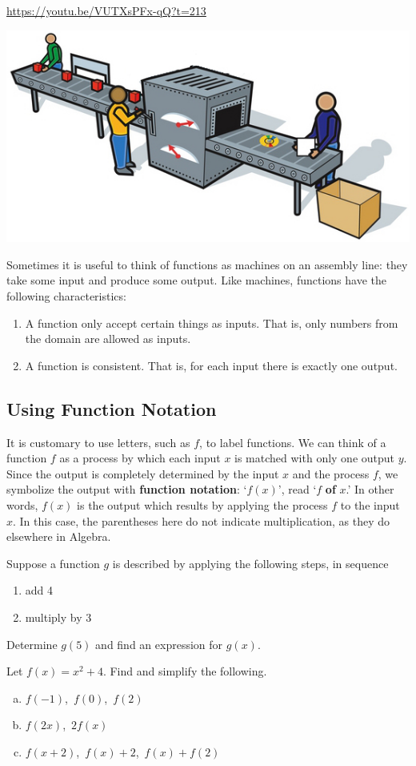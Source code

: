 \documentclass[oneside,10pt]{book}
\begin{document}
\url{https://youtu.be/VUTXsPFx-qQ?t=213}

\includegraphics[width=0.5\linewidth]{3-1-lecture/001Production_Line.jpg}

Sometimes it is useful to think of functions as machines on an assembly line:
they take some input and produce some output. Like machines, functions have the
following characteristics:

\begin{enumerate}
  \item
    A function only accept certain things as inputs.
    That is, only numbers from the domain are allowed as inputs.
  \item
    A function is consistent.
    That is, for each input there is exactly one output.
\end{enumerate}



\subsection{Using Function Notation}

It is customary to use letters, such as $f$, to label functions.
We can think of a function $f$ as a process
by which each input $x$ is matched with only one output $y$.
Since the output is completely determined by the input $x$ and the process $f$, we symbolize the output with \textbf{function notation}: `$f(x)$', read `$f$ \textbf{of} $x$.'
In other words, $f(x)$ is the output which results by applying the process $f$ to the input $x$.
In this case, the parentheses here do not indicate multiplication, as they do elsewhere in Algebra.


\example
Suppose a function $g$ is described by applying the following steps,
in sequence
\begin{enumerate}
  \item  add 4
  \item  multiply by 3
\end{enumerate}
Determine $g(5)$ and find an expression for $g(x)$.
\vfill


\newpage


\example
Let $f(x) = x^2 +  4$.
Find and simplify the following.
\begin{enumerate}[(a)]
  \item $f(-1)$,\ $f(0)$,\, $f(2)$
  \item  $f(2x)$,\, $2 f(x)$
  \item $f(x+2)$,\, $f(x)+2$,\, $f(x) + f(2)$
\end{enumerate}
\vfill
\end{document}
